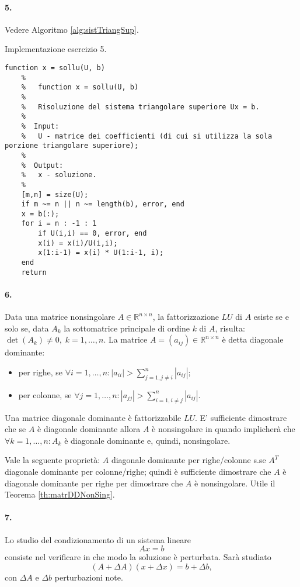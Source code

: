 \paragraph{5.} Vedere Algoritmo \ref{alg:sistTriangSup}.

\begin{algorithm}
\caption{Implementazione esercizio 5.}\label{alg:sistTriangSup}
    \begin{lstlisting}[style=Matlab-editor]
    function x = sollu(U, b)
    %   
    %   function x = sollu(U, b)
    %
    %   Risoluzione del sistema triangolare superiore Ux = b.
    %
    %  Input:
    %   U - matrice dei coefficienti (di cui si utilizza la sola porzione triangolare superiore);
    %
    %  Output:
    %   x - soluzione.
    %
    [m,n] = size(U);
    if m ~= n || n ~= length(b), error, end
    x = b(:);
    for i = n : -1 : 1
        if U(i,i) == 0, error, end
        x(i) = x(i)/U(i,i);
        x(1:i-1) = x(i) * U(1:i-1, i);
    end
    return
    \end{lstlisting}
\end{algorithm}

\paragraph{6.} Data una matrice nonsingolare $A\in\mathbb R^{n\times n}$, la fattorizzazione $LU$ di $A$ esiste se e solo se, data $A_k$ la sottomatrice principale di ordine $k$ di $A$, risulta: $\det(A_k)\neq 0,\; k=1,\hdots, n.$ La matrice $A=(a_{ij})\in\mathbb R^{n\times n}$ è detta diagonale dominante:
\begin{itemize}
    \item per righe, se $\forall i=1,\hdots, n: |a_{ii}|>\sum_{j=1, j\neq i}^n|a_{ij}|$;
    \item per colonne, se $\forall j=1,\hdots, n: |a_{jj}|>\sum_{i=1, i\neq j}^n |a_{ij}|$.
\end{itemize}
Una matrice diagonale dominante è fattorizzabile $LU$. E' sufficiente dimostrare che se $A$ è diagonale dominante allora $A$ è nonsingolare in quando implicherà che $\forall k=1,\hdots, n: A_k$ è diagonale dominante e, quindi, nonsingolare.

Vale la seguente proprietà: $A$ diagonale dominante per righe/colonne s.se $A^T$ diagonale dominante per colonne/righe; quindi è sufficiente dimostrare che $A$ è diagonale dominante per righe per dimostrare che $A$ è nonsingolare. Utile il Teorema \ref{th:matrDDNonSing}.

\paragraph{7.} Lo studio del condizionamento di un sistema lineare
\begin{equation*}
    Ax=b
\end{equation*}
consiste nel verificare in che modo la soluzione è perturbata. Sarà studiato
\begin{equation*}
    (A+\Delta A)(x+\Delta x) = b + \Delta b,
\end{equation*}
con $\Delta A$ e $\Delta b$ perturbazioni note.

